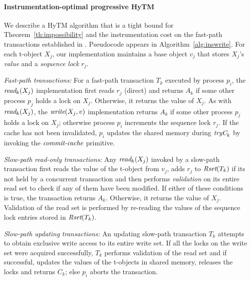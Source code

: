 \paragraph{Instrumentation-optimal progressive HyTM}
We describe a HyTM algorithm that is a tight bound for Theorem~\ref{th:impossibility} and the instrumentation 
cost on the fast-path transactions established in \cite{hytm14disc}.
Pseudocode appears in Algorithm~\ref{alg:inswrite}.
For each t-object $X_j$, our implementation maintains a base object $v_j$ that stores $X_j$'s \emph{value}
and a \emph{sequence lock} $r_{j}$. 

\vspace{1mm}\noindent\textit{Fast-path transactions:}
For a fast-path transaction $T_k$ executed by process $p_i$, the $\textit{read}_k(X_j)$ implementation first reads $r_j$ (direct)
and returns $A_k$ if some other process $p_j$ holds a lock on $X_j$.
Otherwise, it returns the value of $X_j$.
As with $\textit{read}_k(X_j)$, the $\textit{write} (X_j,v)$ implementation returns $A_k$ if some other process $p_j$ holds a lock on $X_j$; otherwise
process $p_i$ increments the sequence lock $r_j$. If the cache has not been invalidated, $p_i$ updates the shared memory
during $\textit{tryC}_k$ by invoking the $\ms{commit-cache}$ primitive.

\vspace{1mm}\noindent\textit{Slow-path read-only transactions:}
Any $\textit{read}_k(X_j)$ invoked by a slow-path transaction first reads the value of the t-object from $v_j$, 
adds $r_j$ to $\textit{Rset}(T_k)$ if its not held by a concurrent transaction
and then performs \emph{validation} on its entire read set to check if any of them have been modified. 
If either of these conditions is true,
the transaction returns $A_k$. Otherwise, it returns the value of $X_j$. 
Validation of the read set is performed by re-reading the values of the sequence lock entries stored in $\textit{Rset}(T_k)$.

\vspace{1mm}\noindent\textit{Slow-path updating transactions:}
An updating slow-path transaction $T_k$ attempts to obtain exclusive write access to its 
entire write set.
If all the locks on the write set were acquired successfully, $T_k$ performs validation of the read set and if successful, updates the values of
the t-objects in shared memory, releases the locks and returns $C_k$; else $p_i$ aborts the transaction.

